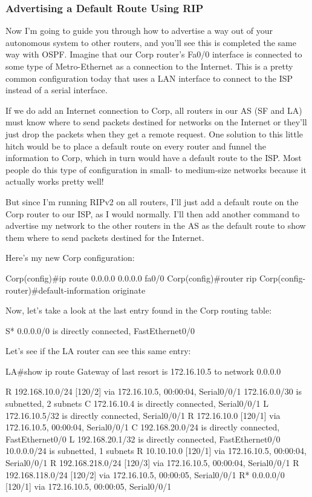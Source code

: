 \subsubsection{Advertising a Default Route Using RIP}

Now I'm going to guide you through how to advertise a way out of your
autonomous system to other routers, and you'll see this is completed the
same way with OSPF. Imagine that our Corp router's Fa0/0 interface is
connected to some type of Metro-Ethernet as a connection to the
Internet. This is a pretty common configuration today that uses a LAN
interface to connect to the ISP instead of a serial interface.

If we do add an Internet connection to Corp, all routers in our AS (SF
and LA) must know where to send packets destined for networks on the
Internet or they'll just drop the
\protect\hypertarget{c09.xhtmlux5cux23Page_398}{}{}packets when they get
a remote request. One solution to this little hitch would be to place a
default route on every router and funnel the information to Corp, which
in turn would have a default route to the ISP. Most people do this type
of configuration in small- to medium-size networks because it actually
works pretty well!

But since I'm running RIPv2 on all routers, I'll just add a default
route on the Corp router to our ISP, as I would normally. I'll then add
another command to advertise my network to the other routers in the AS
as the default route to show them where to send packets destined for the
Internet.

Here's my new Corp configuration:

\begin{cli}
Corp(config)#ip route 0.0.0.0 0.0.0.0 fa0/0
Corp(config)#router rip
Corp(config-router)#default-information originate
\end{cli}

Now, let's take a look at the last entry found in the Corp routing
table:

\begin{cli}
S*   0.0.0.0/0 is directly connected, FastEthernet0/0
\end{cli}

Let's see if the LA router can see this same entry:

\begin{cli}
LA#show ip route
Gateway of last resort is 172.16.10.5 to network 0.0.0.0

R    192.168.10.0/24 [120/2] via 172.16.10.5, 00:00:04, Serial0/0/1
     172.16.0.0/30 is subnetted, 2 subnets
C       172.16.10.4 is directly connected, Serial0/0/1
L       172.16.10.5/32 is directly connected, Serial0/0/1
R       172.16.10.0 [120/1] via 172.16.10.5, 00:00:04, Serial0/0/1
C    192.168.20.0/24 is directly connected, FastEthernet0/0
L    192.168.20.1/32 is directly connected, FastEthernet0/0
     10.0.0.0/24 is subnetted, 1 subnets
R       10.10.10.0 [120/1] via 172.16.10.5, 00:00:04, Serial0/0/1
R    192.168.218.0/24 [120/3] via 172.16.10.5, 00:00:04, Serial0/0/1
R    192.168.118.0/24 [120/2] via 172.16.10.5, 00:00:05, Serial0/0/1
R*   0.0.0.0/0 [120/1] via 172.16.10.5, 00:00:05, Serial0/0/1
\end{cli}

